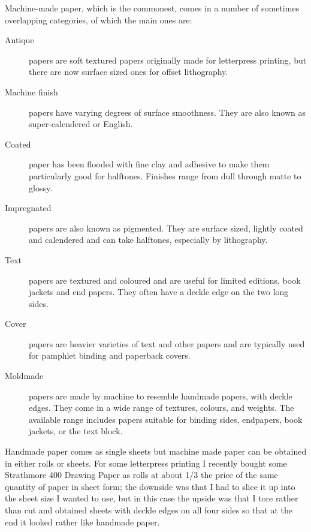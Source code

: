 \documentclass[10pt,letterpaper,extrafontsizes]{memoir}
\begin{document}

    Machine-made paper, which is the commonest, comes in a number of 
sometimes overlapping categories, of which the main ones are:
\begin{description}
\item[Antique] papers are soft textured papers originally
made for letterpress printing, but there are now surface sized ones for
offset lithography. 
\item[Machine finish] papers have varying degrees 
of surface smoothness. They are also known as 
super-calendered or 
English.
\item[Coated] paper has been flooded with fine clay and
adhesive to make them particularly good for halftones. Finishes range from 
dull through matte to glossy. 
\item[Impregnated] papers are also known as
pigmented. They are surface sized, lightly coated
and calendered and can take halftones, especially by lithography.
\item[Text] papers are textured and coloured and are 
useful for limited editions, book jackets and end papers. They often have 
a deckle edge on the two long sides.
\item[Cover] papers are heavier varieties of text and other
papers and are typically used for pamphlet binding and paperback covers.
\item[Moldmade] papers are made by machine to resemble
handmade papers, with deckle edges. They come in a wide range of textures,
colours, and weights. The available range includes papers suitable for
binding sides, endpapers, book jackets, or the text block.
\end{description}

    Handmade paper comes as single sheets but machine made paper can be 
obtained in either rolls or sheets. For some letterpress printing 
I recently bought some Strathmore 400
Drawing Paper as  rolls at about 1/3 the price of the
same quantity of paper in sheet form; the downside was that I had to slice 
it up into
the sheet size I wanted to use, but in this case the upside was that I tore
rather than cut and obtained sheets with deckle edges on all four sides
so that at the end it looked rather like handmade paper.
\end{document}
